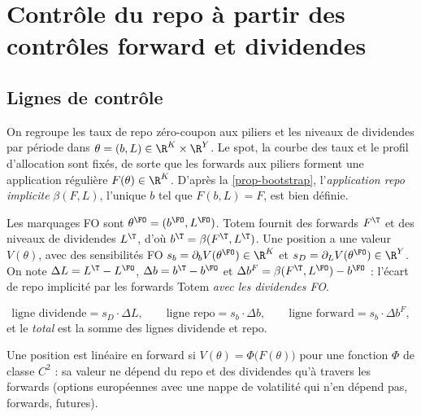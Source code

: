 \section{Contrôle du repo à partir des contrôles forward et dividendes}\label{sec-control}

\subsection{Lignes de contrôle}
On regroupe les taux de repo zéro-coupon aux piliers et les niveaux de dividendes par période dans
$\theta=(b,L)\in\R^K\times\R^Y$. Le spot, la courbe des taux et le profil d'allocation sont fixés, de sorte que les
forwards aux piliers forment une application régulière $F(\theta)\in\R^K$. D'après la \cref{prop-bootstrap},
l'\emph{application repo implicite} $\beta(F,L)$, l'unique $b$ tel que $F(b,L)=F$, est bien définie.

Les marquages FO sont $\theta^\FO=(b^\FO,L^\FO)$. Totem fournit des forwards $F^\T$ et des niveaux de dividendes $L^\T$,
d'où $b^\T=\beta(F^\T,L^\T)$. Une position a une valeur $V(\theta)$, avec des sensibilités FO
$s_b=\partial_bV(\theta^\FO)\in\R^K$ et $s_D=\partial_LV(\theta^\FO)\in\R^Y$. On note $\Delta L=L^\T-L^\FO$,
$\Delta b=b^\T-b^\FO$ et $\Delta b^F=\beta(F^\T,L^\FO)-b^\FO$ : l'écart de repo implicité par les forwards Totem
\emph{avec les dividendes FO}.

\begin{definition}\label{def-lines}
\[
\text{ligne dividende}=s_D\cdot\Delta L,\qquad\text{ligne repo}=s_b\cdot\Delta b,\qquad\text{ligne forward}=s_b\cdot\Delta b^F,
\]
et le \emph{total} est la somme des lignes dividende et repo.
\end{definition}

\begin{definition}\label{def-fwdlinear}
Une position est linéaire en forward si $V(\theta)=\Phi\bigl(F(\theta)\bigr)$ pour une fonction $\Phi$ de classe $C^2$ :
sa valeur ne dépend du repo et des dividendes qu'à travers les forwards (options européennes avec une nappe de
volatilité qui n'en dépend pas, forwards, futures).
\end{definition}

